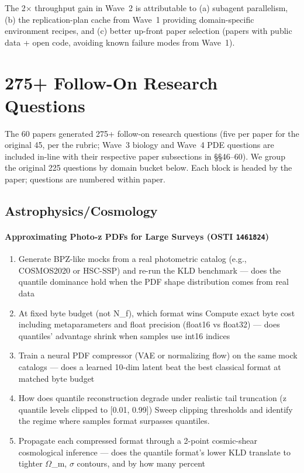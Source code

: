 \documentclass[11pt]{article}
\begin{document}
The 2$\times$ throughput gain in Wave~2 is attributable to (a) subagent
parallelism, (b) the replication-plan cache from Wave~1 providing
domain-specific environment recipes, and (c) better up-front paper
selection (papers with public data + open code, avoiding known failure
modes from Wave~1).

\clearpage\section{275+ Follow-On Research Questions}
The 60 papers generated 275+ follow-on research questions (five per paper for the original 45, per the rubric; Wave~3 biology and Wave~4 PDE questions are included in-line with their respective paper subsections in \S\S46--60). We group the original 225 questions by domain bucket below. Each block is headed by the paper; questions are numbered within paper.
\subsection*{Astrophysics/Cosmology}
\paragraph{Approximating Photo-z PDFs for Large Surveys \textnormal{\small(OSTI \texttt{1461824})}}
\begin{enumerate}[leftmargin=1.6em,itemsep=0.2em,topsep=0.2em,label=Q\arabic*.]
\item Generate BPZ-like mocks from a real photometric catalog (e.g., COSMOS2020 or HSC-SSP) and re-run the KLD benchmark --- does the quantile dominance hold when the PDF shape distribution comes from real data
\item At fixed byte budget (not N\_f), which format wins Compute exact byte cost including metaparameters and float precision (float16 vs float32) --- does quantiles' advantage shrink when samples use int16 indices
\item Train a neural PDF compressor (VAE or normalizing flow) on the same mock catalogs --- does a learned 10-dim latent beat the best classical format at matched byte budget
\item How does quantile reconstruction degrade under realistic tail truncation (z quantile levels clipped to [0.01, 0.99]) Sweep clipping thresholds and identify the regime where samples format surpasses quantiles.
\item Propagate each compressed format through a 2-point cosmic-shear cosmological inference --- does the quantile format's lower KLD translate to tighter $\Omega$\_m, $\sigma$ contours, and by how many percent
\end{enumerate}
\end{document}
